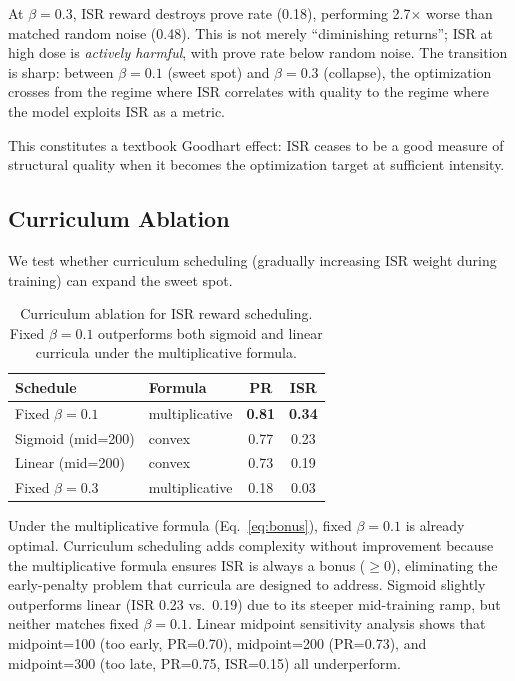 \documentclass[11pt,twocolumn]{article}
\newcommand{\isr}{\textsc{ISR}}
\newcommand{\pr}{\textsc{PR}}
\begin{document}
At $\beta{=}0.3$, ISR reward destroys prove rate (0.18), performing 2.7$\times$ worse than matched random noise (0.48).
This is not merely ``diminishing returns''; \isr{} at high dose is \emph{actively harmful}, with prove rate below random noise.
The transition is sharp: between $\beta{=}0.1$ (sweet spot) and $\beta{=}0.3$ (collapse), the optimization crosses from the regime where \isr{} correlates with quality to the regime where the model exploits \isr{} as a metric.

This constitutes a textbook Goodhart effect: \isr{} ceases to be a good measure of structural quality when it becomes the optimization target at sufficient intensity.

\subsection{Curriculum Ablation}

We test whether curriculum scheduling (gradually increasing ISR weight during training) can expand the sweet spot.

\begin{table}[h]
\centering
\caption{Curriculum ablation for ISR reward scheduling. Fixed $\beta{=}0.1$ outperforms both sigmoid and linear curricula under the multiplicative formula.}
\label{tab:curriculum}
\small
\begin{tabular}{@{}llcc@{}}
\toprule
Schedule & Formula & \pr{} & \isr{} \\
\midrule
Fixed $\beta{=}0.1$ & multiplicative & \textbf{0.81} & \textbf{0.34} \\
Sigmoid (mid=200) & convex & 0.77 & 0.23 \\
Linear (mid=200) & convex & 0.73 & 0.19 \\
Fixed $\beta{=}0.3$ & multiplicative & 0.18 & 0.03 \\
\bottomrule
\end{tabular}
\end{table}

Under the multiplicative formula (Eq.~\ref{eq:bonus}), fixed $\beta{=}0.1$ is already optimal.
Curriculum scheduling adds complexity without improvement because the multiplicative formula ensures \isr{} is always a bonus ($\geq 0$), eliminating the early-penalty problem that curricula are designed to address.
Sigmoid slightly outperforms linear (ISR 0.23 vs.\ 0.19) due to its steeper mid-training ramp, but neither matches fixed $\beta{=}0.1$.
Linear midpoint sensitivity analysis shows that midpoint=100 (too early, \pr{}=0.70), midpoint=200 (\pr{}=0.73), and midpoint=300 (too late, \pr{}=0.75, \isr{}=0.15) all underperform.
\end{document}

